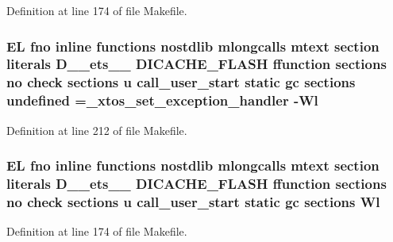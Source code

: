 Definition at line 174 of file Makefile.

\hypertarget{Makefile_a9324bb2c20136255586f3b51593c4291}{
\subsubsection[{undefined}]{\setlength{\rightskip}{0pt plus 5cm}E\-L fno inline functions nostdlib mlongcalls mtext section literals D\-\_\-\-\_\-ets\-\_\-\-\_\- D\-I\-C\-A\-C\-H\-E\-\_\-\-F\-L\-A\-S\-H ffunction sections no check sections u call\-\_\-user\-\_\-start static gc sections undefined =\-\_\-xtos\-\_\-set\-\_\-exception\-\_\-handler -\/{\bf Wl}\hspace{0.3cm}{\ttfamily [static]}}}\label{Makefile_a9324bb2c20136255586f3b51593c4291}


Definition at line 212 of file Makefile.

\hypertarget{Makefile_afb1782b240d70229ae5bc6b111f9794a}{
\subsubsection[{Wl}]{\setlength{\rightskip}{0pt plus 5cm}E\-L fno inline functions nostdlib mlongcalls mtext section literals D\-\_\-\-\_\-ets\-\_\-\-\_\- D\-I\-C\-A\-C\-H\-E\-\_\-\-F\-L\-A\-S\-H ffunction sections no check sections u call\-\_\-user\-\_\-start static gc sections Wl}}\label{Makefile_afb1782b240d70229ae5bc6b111f9794a}


Definition at line 174 of file Makefile.

